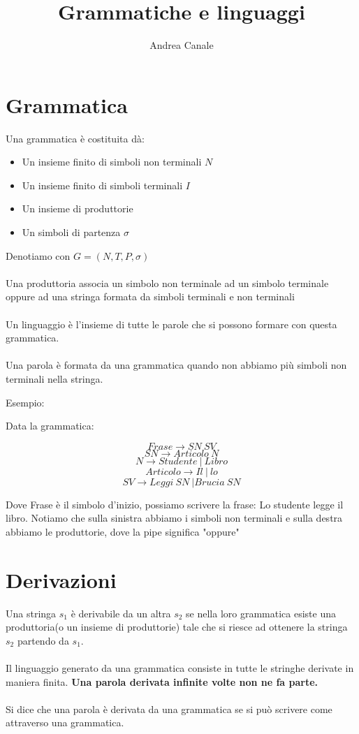 \documentclass[a4paper, 10pt]{article}
\title{Grammatiche e linguaggi}
\author{Andrea Canale}
\begin{document}
	\maketitle
	\tableofcontents
\section{Grammatica}

Una grammatica è costituita dà:

\begin{itemize}
	\item Un insieme finito di simboli non terminali $N$
	\item Un insieme finito di simboli terminali $I$
	\item Un insieme di produttorie
	\item Un simboli di partenza $\sigma$
\end{itemize}

Denotiamo con $G=(N, T, P, \sigma)$
\\\\
Una produttoria associa un simbolo non terminale ad un simbolo terminale oppure ad una stringa formata da simboli terminali e non terminali
\\\\
Un linguaggio è l'insieme di tutte le parole che si possono formare con questa grammatica.
\\\\
Una parola è formata da una grammatica quando non abbiamo più simboli non terminali nella stringa.

Esempio:

Data la grammatica:

$$Frase \rightarrow SN\ SV $$
$$SN \rightarrow Articolo\ N$$
$$N \rightarrow Studente\ |\ Libro$$
$$Articolo \rightarrow Il\ |\ lo$$
$$SV \rightarrow Leggi\ SN\ | Brucia\ SN $$

Dove Frase è il simbolo d'inizio, 
possiamo scrivere la frase: Lo studente legge il libro.
Notiamo che sulla sinistra abbiamo i simboli non terminali e sulla destra abbiamo le produttorie, dove la pipe significa "oppure"

\section{Derivazioni}

Una stringa $s_1$ è derivabile da un altra $s_2$ se nella loro grammatica esiste una produttoria(o un insieme di produttorie) tale che si riesce ad ottenere la stringa $s_2$ partendo da $s_1$.
\\\\
Il linguaggio generato da una grammatica consiste in tutte le stringhe derivate in maniera finita. \textbf{Una parola derivata infinite volte non ne fa parte.}
\\\\
Si dice che una parola è derivata da una grammatica se si può scrivere come attraverso una grammatica.
\end{document}
